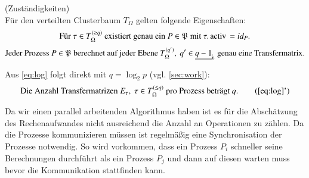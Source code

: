   \begin{lem}
    (Zuständigkeiten)\\
    Für den verteilten Clusterbaum $T_\Omega$ gelten folgende Eigenschaften:
    \begin{equation}
      \text{Für } \tau \in T_\Omega^{(\geq q)} \text{ existiert genau ein } P \in \Proc \text{ mit } \tau.\tcode{activ} = id_P.
    \end{equation}
    \begin{equation}
      \text{Jeder Prozess } P \in \Proc \text{ berechnet auf jeder Ebene } T_\Omega^{(q')}, \ q' \in \nullhaken{q-1} \text{ genau eine Transfermatrix.}\label{eq:log}
    \end{equation}

    Aus \autoref{eq:log} folgt direkt mit $q = \log_2 p$ (vgl. \autoref{sec:work}):
    \begin{equation}
      \text{Die Anzahl Transfermatrizen } E_\tau, \ \tau \in T_\Omega^{(\leq q)} \text{ pro Prozess beträgt } q.\tag{\ref{eq:log}'}
    \end{equation}
  \end{lem}


  Da wir einen parallel arbeitenden Algorithmus haben ist es für die Abschätzung des Rechenaufwandes nicht ausreichend die Anzahl an Operationen zu zählen. Da die Prozesse kommunizieren müssen ist 
  regelmäßig eine Synchronisation der Prozesse notwendig. So wird vorkommen, dass ein Prozess $P_i$ schneller seine Berechnungen durchführt als ein Prozess $P_j$ und dann auf diesen warten muss bevor
  die Kommunikation stattfinden kann. 
  
